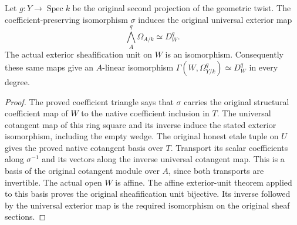 \begin{lemma}
\label{lem:cartier-geometric-local-cotangent-source}
\leanok
{}
Let $g:Y\to\operatorname{Spec}k$ be the original second projection of
the geometric twist. The coefficient-preserving isomorphism $\sigma$
induces the original universal exterior map
\[
 \bigwedge_A^q\Omega_{A/k}\simeq D_W^q.
\]
The actual exterior sheafification unit on $W$ is an isomorphism.
Consequently these same maps give an $A$-linear isomorphism
$\Gamma(W,\Omega^q_{Y/k})\simeq D_W^q$ in every degree.
\end{lemma}
\begin{proof}
The proved coefficient triangle says that $\sigma$ carries the
original structural coefficient map of $W$ to the native coefficient
inclusion in $T$. The universal cotangent map of this ring square
and its inverse induce the stated exterior isomorphism, including
the empty wedge. The original honest etale tuple on $U$ gives the
proved native cotangent basis over $T$. Transport its scalar
coefficients along $\sigma^{-1}$ and its vectors along the inverse
universal cotangent map. This is a basis of the original cotangent
module over $A$, since both transports are invertible. The actual
open $W$ is affine. The affine exterior-unit theorem applied to this
basis proves the original sheafification unit bijective. Its inverse
followed by the universal exterior map is the required isomorphism
on the original sheaf sections.
\end{proof}

